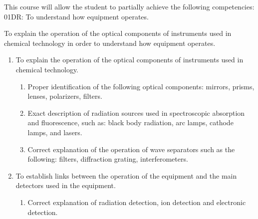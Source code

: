 {This course will allow the student to partially achieve the following competencies:
01DR: To understand how equipment operates.

To explain the operation of the optical components of instruments used in chemical technology in order to understand how equipment operates.
\begin{enumerate}
\item To explain the operation of the optical components of instruments used in chemical technology.
\begin{enumerate}
	\item Proper identification of the following optical components: mirrors, prisms, lenses, polarizers, filters.
	\item Exact description of radiation sources used in spectroscopic absorption and fluorescence, such as: black body radiation, arc lamps, cathode lamps, and lasers.
	\item Correct explanation of the operation of wave separators such as the following: filters, diffraction grating, interferometers.
\end{enumerate}
\item To establish links between the operation of the equipment and the main detectors used in the equipment.
\begin{enumerate}
	\item Correct explanation of radiation detection, ion detection and electronic detection.
\end{enumerate}
\end{enumerate}
\smallskip

}
